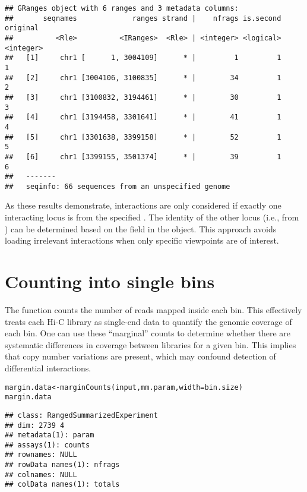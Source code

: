 \documentclass{report}\usepackage[]{graphicx}\usepackage[usenames,dvipsnames]{color}
\newcommand{\hlstd}[1]{\textcolor[rgb]{0.251,0.251,0.251}{#1}}%
\newcommand{\hlkwb}[1]{\textcolor[rgb]{0,0,0}{#1}}%
\newcommand{\hlkwc}[1]{\textcolor[rgb]{0.251,0.251,0.251}{#1}}%
\newcommand{\hlkwd}[1]{\textcolor[rgb]{0.878,0.439,0.125}{#1}}%
\newenvironment{knitrout}{}{} %
\begin{document}
\begin{knitrout}
\begin{kframe}
\begin{alltt}
\end{alltt}
\begin{verbatim}
## GRanges object with 6 ranges and 3 metadata columns:
##       seqnames             ranges strand |    nfrags is.second  original
##          <Rle>          <IRanges>  <Rle> | <integer> <logical> <integer>
##   [1]     chr1 [      1, 3004109]      * |         1         1         1
##   [2]     chr1 [3004106, 3100835]      * |        34         1         2
##   [3]     chr1 [3100832, 3194461]      * |        30         1         3
##   [4]     chr1 [3194458, 3301641]      * |        41         1         4
##   [5]     chr1 [3301638, 3399158]      * |        52         1         5
##   [6]     chr1 [3399155, 3501374]      * |        39         1         6
##   -------
##   seqinfo: 66 sequences from an unspecified genome
\end{verbatim}
\end{kframe}
\end{knitrout}

As these results demonstrate, interactions are only considered if exactly one interacting locus is from the specified .
The identity of the other locus (i.e., from ) can be determined based on the  field in the  object.
This approach avoids loading irrelevant interactions when only specific viewpoints are of interest.

\section{Counting into single bins}
\label{sec:marginal}
The  function counts the number of reads mapped inside each bin.
This effectively treats each Hi-C library as single-end data to quantify the genomic coverage of each bin.
One can use these ``marginal'' counts to determine whether there are systematic differences in coverage between libraries for a given bin.
This implies that copy number variations are present, which may confound detection of differential interactions.

\begin{knitrout}
\color{fgcolor}\begin{kframe}
\begin{alltt}
\hlstd{margin.data} \hlkwb{<-} \hlkwd{marginCounts}\hlstd{(input, mm.param,} \hlkwc{width}\hlstd{=bin.size)}
\hlstd{margin.data}
\end{alltt}
\begin{verbatim}
## class: RangedSummarizedExperiment 
## dim: 2739 4 
## metadata(1): param
## assays(1): counts
## rownames: NULL
## rowData names(1): nfrags
## colnames: NULL
## colData names(1): totals
\end{verbatim}
\end{kframe}
\end{knitrout}
\end{document}
